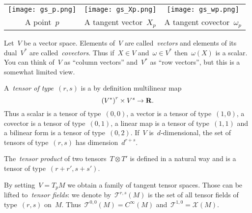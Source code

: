

\begin{tabular}{ccc}
	\texttt{[image: gs\_p.png]} &
	\texttt{[image: gs\_Xp.png]} &
	\texttt{[image: gs\_wp.png]} \\
	A point~$p$ &
	A tangent vector~$X_p$ &
	A tangent covector~$\omega_p$
\end{tabular}

Let~$V$ be a vector space.  Elements of~$V$ are called~\emph{vectors} and
elements of its dual~$V^*$ are called~\emph{covectors}.
Thus if~$X\in V$ and~$\omega\in V^*$ then~$\omega(X)$ is a scalar.
You can think of~$V$ as ``column vectors'' and~$V^*$ as ``row vectors'', but
this is a somewhat limited view.

A~\emph{tensor of type~$(r,s)$} is a by definition multilinear map
\[
	\left(V^*\right)^r\times V^s\to\mathbf{R}.
\]
Thus a scalar is a tensor of type~$(0,0)$, a vector is a tensor of
type~$(1,0)$, a covector is a tensor of type~$(0,1)$, a linear map is a
tensor of type~$(1,1)$ and a bilinear form is a tensor of type~$(0,2)$.
If~$V$ is~$d$-dimensional, the set of tensors of type~$(r,s)$ has
dimension~$d^{r+s}$.

The~\emph{tensor product} of two tensors~$T\otimes T'$ is defined in a natural
way and is a tensor of type~$(r+r',s+s')$.

By setting~$V=T_pM$ we obtain a family of tangent tensor spaces.  Those can
be lifted to~\emph{tensor fields}: we denote by~$\mathcal{T}^{r,s}(M)$ is the
set of all tensor fields of type~$(r,s)$ on~$M$.
Thus~$\mathcal{T}^{0,0}(M)=C^\infty(M)$
and~$\mathcal{T}^{1,0}=\mathcal{X}(M)$.


